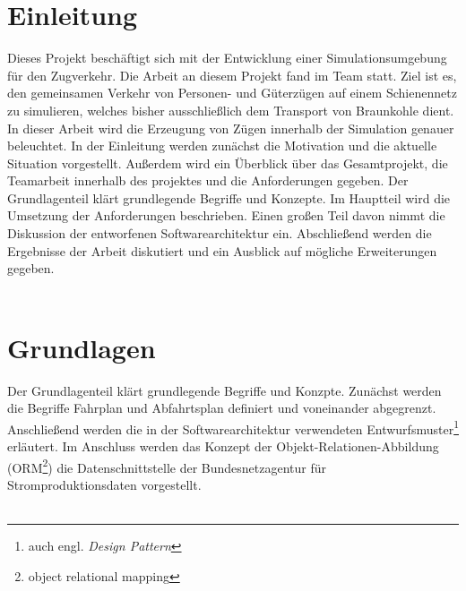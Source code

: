 \documentclass{scrbook} %
\begin{document}
	\ifisbook\fi
	\ifisbook\cleardoubleemptypage\fi

	
	\ifisbook\cleardoubleemptypage\fi
	\tableofcontents
	\cleardoublepage


	\chapter{Einleitung}
	Dieses Projekt beschäftigt sich mit der Entwicklung einer Simulationsumgebung für den Zugverkehr. Die Arbeit an diesem Projekt fand im Team statt. Ziel ist es, den gemeinsamen Verkehr von Personen- und Güterzügen auf einem Schienennetz zu simulieren, welches bisher ausschließlich dem Transport von Braunkohle dient. In dieser Arbeit wird die Erzeugung von Zügen innerhalb der Simulation genauer beleuchtet. In der Einleitung werden zunächst die Motivation und die aktuelle Situation vorgestellt. Außerdem wird ein Überblick über das Gesamtprojekt, die Teamarbeit innerhalb des projektes und die Anforderungen gegeben. Der Grundlagenteil klärt grundlegende Begriffe und Konzepte. Im Hauptteil wird die Umsetzung der Anforderungen beschrieben. Einen großen Teil davon nimmt die Diskussion der entworfenen Softwarearchitektur ein. Abschließend werden die Ergebnisse der Arbeit diskutiert und ein Ausblick auf mögliche Erweiterungen gegeben.\\
	\\
	
	
	
	
	

	\chapter{Grundlagen}
	Der Grundlagenteil klärt grundlegende Begriffe und Konzpte. Zunächst werden die Begriffe Fahrplan und Abfahrtsplan definiert und voneinander abgegrenzt. Anschließend werden die in der Softwarearchitektur verwendeten Entwurfsmuster\footnote{auch engl. \emph{Design Pattern}} erläutert. Im Anschluss werden das Konzept der Objekt-Relationen-Abbildung (ORM\footnote{object relational mapping}) die Datenschnittstelle der Bundesnetzagentur für Stromproduktionsdaten vorgestellt.\\
	\\
	
	
	
	
	
\end{document}
